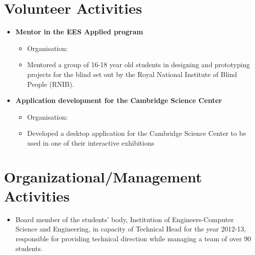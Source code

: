 \documentclass[10pt]{article}
\begin{document}
\section*{Volunteer Activities}
\begin{itemize}
	\item\bf{Mentor in the EES Applied program}
	\begin{itemize}
		\item[] Organisation: 
		\item[] Mentored a group of 16-18 year old students in designing and prototyping projects for the blind set out by the Royal National Institute of Blind People (RNIB).
	\end{itemize}
	\item\bf{Application development for the Cambridge Science Center}
	\begin{itemize}
		\item[] Organisation: 
		\item[] Developed a desktop application for the Cambridge Science Center to be used in one of their interactive exhibitions
	\end{itemize}
\end{itemize}

\section*{Organizational/Management Activities}
\begin{itemize}
	\item[] Board member of the students’ body, Institution of Engineers-Computer Science and Engineering, in capacity of Technical Head for the year 2012-13, responsible for providing technical direction while managing a team of over 90 students.
\end{itemize}
\end{document}
